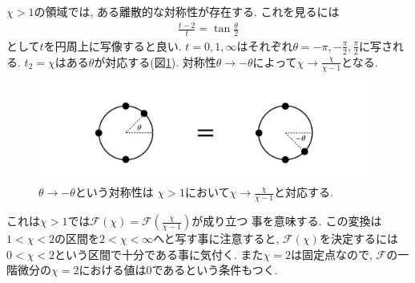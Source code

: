 $\chi > 1$の領域では, ある離散的な対称性が存在する. 
これを見るには
\begin{align}
	\frac{t-2}{t} = \tan \frac{\theta}{2}
\end{align}
として$t$を円周上に写像すると良い. 
$t = 0, 1, \infty$はそれぞれ$\theta = -\pi, -\frac{\pi}{2}, \frac{\pi}{2}$に写される. 
$t_2 = \chi$はある$\theta$が対応する(図\ref{fig:circle}). 
対称性$\theta \to -\theta$によって$\chi \to \frac{\chi}{\chi - 1}$となる. 
\begin{figure}[ht]
	\centering
	\includegraphics[width=11cm]{figures/circle}
	\caption{$\theta \to -\theta$という対称性は
		$\chi > 1$において$\chi \to \frac{\chi}{\chi - 1}$と対応する. }
	\label{fig:circle}
\end{figure}

これは$\chi > 1$では$\mathcal{F}(\chi) = \mathcal{F}(\frac{\chi}{\chi - 1})$が成り立つ
事を意味する. 
この変換は$1 < \chi < 2$の区間を$2 < \chi < \infty$へと写す事に注意すると, 
$\mathcal{F}(\chi)$を決定するには$0 < \chi < 2$という区間で十分である事に気付く. 
また$\chi = 2$は固定点なので, $\mathcal{F}$の一階微分の$\chi = 2$における値は0であるという条件もつく. 

